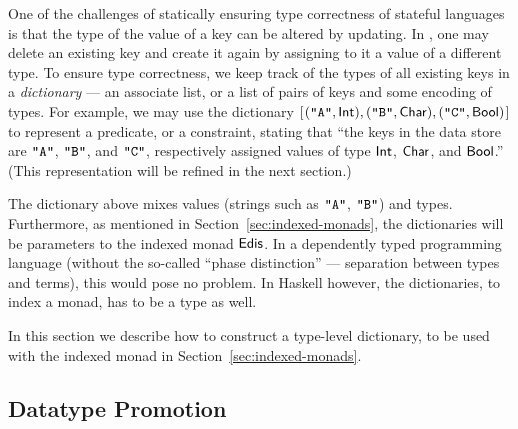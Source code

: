 One of the challenges of statically ensuring type correctness of stateful
languages is that the type of the value of a key can be altered by updating.
In \Redis{}, one may delete an existing key and create it again by assigning to
it a value of a different type. To ensure type correctness, we keep track of the
types of all existing keys in a {\em dictionary} --- an associate list, or a
list of pairs of keys and some encoding of types. For example, we may use the
dictionary \ensuremath{[\mskip1.5mu (\text{\tt \char34 A\char34},\Conid{Int}),(\text{\tt \char34 B\char34},\Conid{Char}),(\text{\tt \char34 C\char34},\Conid{Bool})\mskip1.5mu]} to represent a
predicate, or a constraint, stating that ``the keys in the data store are \ensuremath{\text{\tt \char34 A\char34}},
\ensuremath{\text{\tt \char34 B\char34}}, and \ensuremath{\text{\tt \char34 C\char34}}, respectively assigned values of type \ensuremath{\Conid{Int}}, \ensuremath{\Conid{Char}}, and
\ensuremath{\Conid{Bool}}.'' (This representation will be refined in the next section.)

The dictionary above mixes values (strings such as \ensuremath{\text{\tt \char34 A\char34}}, \ensuremath{\text{\tt \char34 B\char34}}) and types.
Furthermore, as mentioned in Section~\ref{sec:indexed-monads}, the
dictionaries will be parameters to the indexed monad \ensuremath{\Conid{Edis}}. In a dependently
typed programming language (without the so-called ``phase distinction'' ---
separation between types and terms), this would pose no problem. In Haskell
however, the dictionaries, to index a monad, has to be a type as well.

In this section we describe how to construct a type-level dictionary, to be
used with the indexed monad in Section~\ref{sec:indexed-monads}.

\subsection{Datatype Promotion}

